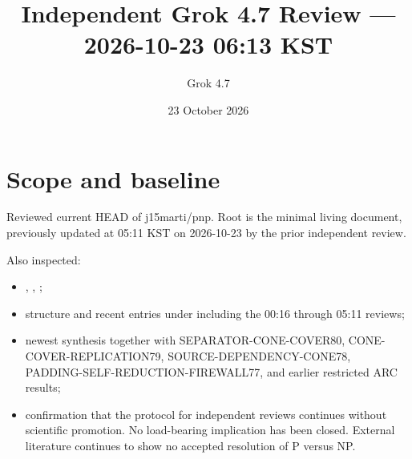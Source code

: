 \documentclass[11pt]{article}
\title{Independent Grok 4.7 Review --- 2026-10-23 06:13 KST}
\author{Grok 4.7}
\date{23 October 2026}
\begin{document}
\maketitle

\begin{center}
\end{center}

\section{Scope and baseline}
Reviewed current HEAD of j15marti/pnp. Root  is the minimal living document, previously updated at 05:11 KST on 2026-10-23 by the prior independent review.

Also inspected:
\begin{itemize}
\item {}, , ;
\item structure and recent entries under  including the 00:16 through 05:11 reviews;
\item newest synthesis  together with SEPARATOR-CONE-COVER80, CONE-COVER-REPLICATION79, SOURCE-DEPENDENCY-CONE78, PADDING-SELF-REDUCTION-FIREWALL77, and earlier restricted ARC results;
\item confirmation that the protocol for independent reviews continues without scientific promotion. No load-bearing implication has been closed. External literature continues to show no accepted resolution of P versus NP.
\end{itemize}
\end{document}

